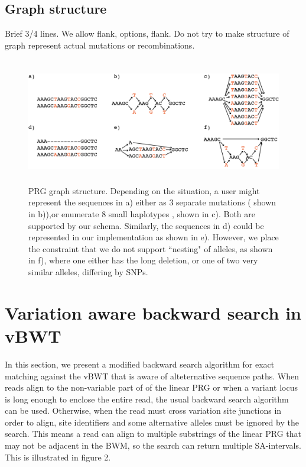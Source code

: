 \documentclass[runningheads,a4paper]{llncs}
\begin{document}
\subsection{Graph structure}
Brief 3/4 lines. We allow flank, options, flank. Do not try to make structure of graph represent actual mutations or recombinations.

\begin{figure}
\centering
\includegraphics[height=5.5cm]{graph_construction.png}
\caption{PRG graph structure. Depending on the situation, a user might represent the sequences in a) either as 3 separate mutations ( shown in b)),or enumerate 8 small haplotypes , shown in c). Both are supported by our schema. Similarly, the sequences in d) could be represented in our implementation as shown in e). However, we place the constraint that we do not support ``nesting" of alleles, as shown in f), where one either has the long deletion, or one of two very similar alleles, differing by SNPs.}
\label{lab}
\end{figure}

\section{Variation aware backward search in vBWT}
In this section, we present a modified backward search algorithm for exact matching against the vBWT that is aware of alteternative sequence paths. When reads align to the non-variable part of of the linear PRG or when a variant locus is long enough to enclose the entire read, the usual backward search algorithm can be used. Otherwise, when the read must cross variation site junctions in order to align, site identifiers and some alternative alleles must be ignored by the search. This means a read can align to multiple substrings of the linear PRG that may not be adjacent in the BWM, so the search can return multiple SA-intervals. This is illustrated in figure 2.
\end{document}
